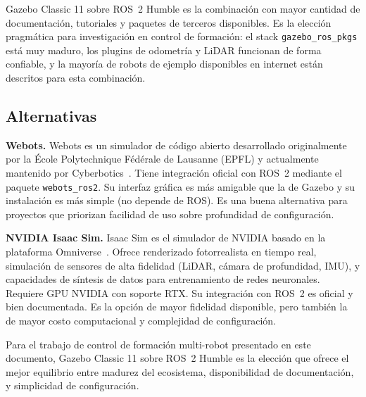 Gazebo Classic 11 sobre ROS~2 Humble es la combinación con mayor cantidad de documentación, tutoriales y paquetes de terceros disponibles. Es la elección pragmática para investigación en control de formación: el stack \texttt{gazebo\_ros\_pkgs} está muy maduro, los plugins de odometría y LiDAR funcionan de forma confiable, y la mayoría de robots de ejemplo disponibles en internet están descritos para esta combinación.

\subsection{Alternativas}

\textbf{Webots.} Webots es un simulador de código abierto desarrollado originalmente por la École Polytechnique Fédérale de Lausanne (EPFL) y actualmente mantenido por Cyberbotics~\cite{webots2019}. Tiene integración oficial con ROS~2 mediante el paquete \texttt{webots\_ros2}. Su interfaz gráfica es más amigable que la de Gazebo y su instalación es más simple (no depende de ROS). Es una buena alternativa para proyectos que priorizan facilidad de uso sobre profundidad de configuración.

\textbf{NVIDIA Isaac Sim.} Isaac Sim es el simulador de NVIDIA basado en la plataforma Omniverse~\cite{issac2023}. Ofrece renderizado fotorrealista en tiempo real, simulación de sensores de alta fidelidad (LiDAR, cámara de profundidad, IMU), y capacidades de síntesis de datos para entrenamiento de redes neuronales. Requiere GPU NVIDIA con soporte RTX. Su integración con ROS~2 es oficial y bien documentada. Es la opción de mayor fidelidad disponible, pero también la de mayor costo computacional y complejidad de configuración.

Para el trabajo de control de formación multi-robot presentado en este documento, Gazebo Classic 11 sobre ROS~2 Humble es la elección que ofrece el mejor equilibrio entre madurez del ecosistema, disponibilidad de documentación, y simplicidad de configuración.
